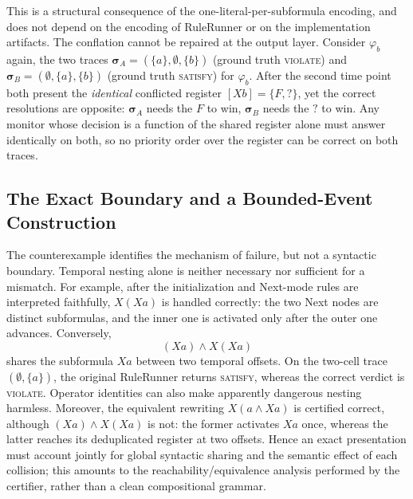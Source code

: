 This is a structural consequence of the one-literal-per-subformula encoding, and does not depend on the encoding of RuleRunner or on the implementation artifacts. 
The conflation cannot be repaired at the output layer. Consider $\varphi_b$ again, the two traces $\boldsymbol{\sigma}_A = (\{a\}, \emptyset, \{b\})$ (ground truth \textsc{violate}) and $\boldsymbol{\sigma}_B = (\emptyset, \{a\}, \{b\})$ (ground truth \textsc{satisfy}) for $\varphi_b$. After the second time point both present the \emph{identical} conflicted register $[Xb] = \{F, ?\}$, yet the correct resolutions are opposite: $\boldsymbol{\sigma}_A$ needs the $F$ to win, $\boldsymbol{\sigma}_B$ needs the $?$ to win. Any monitor whose decision is a function of the shared register alone must answer identically on both, so no priority order over the register can be correct on both traces.


\subsection{The Exact Boundary and a Bounded-Event Construction}
\label{sec:rulerunner-bounded}

The counterexample identifies the mechanism of failure, but not a syntactic
boundary.  Temporal nesting alone is neither necessary nor sufficient for a
mismatch.  For example, after the initialization and Next-mode rules are
interpreted faithfully, $X(Xa)$ is handled correctly: the two Next nodes are
distinct subformulas, and the inner one is activated only after the outer one
advances.  Conversely,
\[
    (Xa)\land X(Xa)
\]
shares the subformula $Xa$ between two temporal offsets.  On the two-cell trace
$(\emptyset,\{a\})$, the original RuleRunner returns \textsc{satisfy}, whereas
the correct verdict is \textsc{violate}.  Operator identities can also make
apparently dangerous nesting harmless.  Moreover, the equivalent rewriting
$X(a\land Xa)$ is certified correct, although $(Xa)\land X(Xa)$ is not: the
former activates $Xa$ once, whereas the latter reaches its deduplicated
register at two offsets.  Hence an exact presentation must account jointly for
global syntactic sharing and the semantic effect of each collision; this
amounts to the reachability/equivalence analysis performed by the certifier,
rather than a clean compositional grammar.

